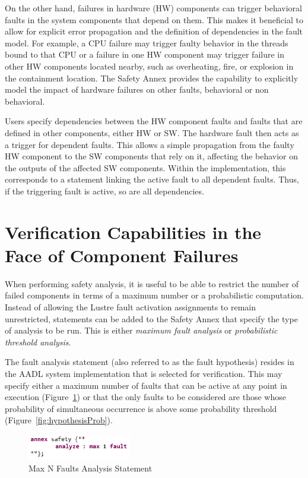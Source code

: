 On the other hand, failures in hardware (HW) components can trigger behavioral faults in the system components that depend on them. This makes it beneficial to allow for explicit error propagation and the definition of dependencies in the fault model. For example, a CPU failure may trigger faulty behavior in the threads bound to that CPU or a failure in one HW component may trigger failure in other HW components located nearby, such as overheating, fire, or explosion
in the containment location. The Safety Annex provides the capability to explicitly model the impact of hardware failures on other faults, behavioral or non behavioral. 

Users specify dependencies between the HW component faults and faults that are defined in other components, either HW or SW. The hardware fault then acts as a trigger for dependent faults. This allows a simple propagation from the faulty HW component to the SW components that rely on it, affecting the behavior on the outputs of the affected SW components. Within the implementation, this corresponds to a statement linking the active fault to all dependent faults. Thus, if the triggering fault is active, so are all dependencies.

\section{Verification Capabilities in the Face of Component Failures}
When performing safety analysis, it is useful to be able to restrict the number of failed components in terms of a maximum number or a probabilistic computation. Instead of allowing the Lustre fault activation assignments to remain unrestricted, statements can be added to the Safety Annex that specify the type of analysis to be run. This is either \textit{maximum fault analysis} or \textit{probabilistic threshold analysis}. 

The fault analysis statement (also referred to as the fault hypothesis) resides in the AADL system implementation that is selected for verification. This may specify either a maximum number of faults that can be active at any point in execution (Figure~\ref{fig:hypothesisMaxN}) or that the only faults to be considered are those whose probability of simultaneous occurrence is above some probability threshold (Figure~\ref{fig:hypothesisProb}).

\begin{figure}[h!]
	\vspace{-0.1in}
	\begin{center}
		\includegraphics[width=0.4\textwidth]{images/hypothesisMaxN.png}
	\end{center}
	\vspace{-0.1in}
	\caption{Max N Faults Analysis Statement}
	\label{fig:hypothesisMaxN}
\end{figure} 

